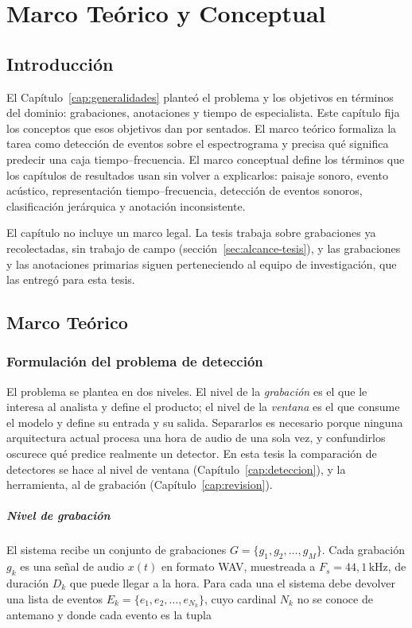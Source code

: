 \chapter{Marco Teórico y Conceptual}
\label{cap:marco}

\section{Introducción}

El Capítulo~\ref{cap:generalidades} planteó el problema y los objetivos en
términos del dominio: grabaciones, anotaciones y tiempo de especialista. Este
capítulo fija los conceptos que esos objetivos dan por sentados. El marco teórico
formaliza la tarea como detección de eventos sobre el espectrograma y precisa qué
significa predecir una caja tiempo--frecuencia. El marco conceptual define los
términos que los capítulos de resultados usan sin volver a explicarlos: paisaje
sonoro, evento acústico, representación tiempo--frecuencia, detección de eventos
sonoros, clasificación jerárquica y anotación inconsistente.

El capítulo no incluye un marco legal. La tesis trabaja sobre grabaciones ya
recolectadas, sin trabajo de campo (sección~\ref{sec:alcance-tesis}), y las
grabaciones y las anotaciones primarias siguen perteneciendo al equipo de
investigación, que las entregó para esta tesis.

\section{Marco Teórico}

\subsection{Formulación del problema de detección}
\label{sec:formulacion}

El problema se plantea en dos niveles. El nivel de la \emph{grabación} es el que
le interesa al analista y define el producto; el nivel de la \emph{ventana} es el
que consume el modelo y define su entrada y su salida. Separarlos es necesario
porque ninguna arquitectura actual procesa una hora de audio de una sola vez, y
confundirlos oscurece qué predice realmente un detector. En esta tesis la
comparación de detectores se hace al nivel de ventana
(Capítulo~\ref{cap:deteccion}), y la herramienta, al de grabación
(Capítulo~\ref{cap:revision}).

\paragraph{Nivel de grabación}
El sistema recibe un conjunto de grabaciones $G=\{g_1,g_2,\dots,g_M\}$. Cada
grabación $g_k$ es una señal de audio $x(t)$ en formato WAV, muestreada a
$F_s = 44{,}1$\,kHz, de duración $D_k$ que puede llegar a la hora. Para cada una
el sistema debe devolver una lista de eventos $E_k=\{e_1,e_2,\dots,e_{N_k}\}$,
cuyo cardinal $N_k$ no se conoce de antemano y donde cada evento es la tupla


